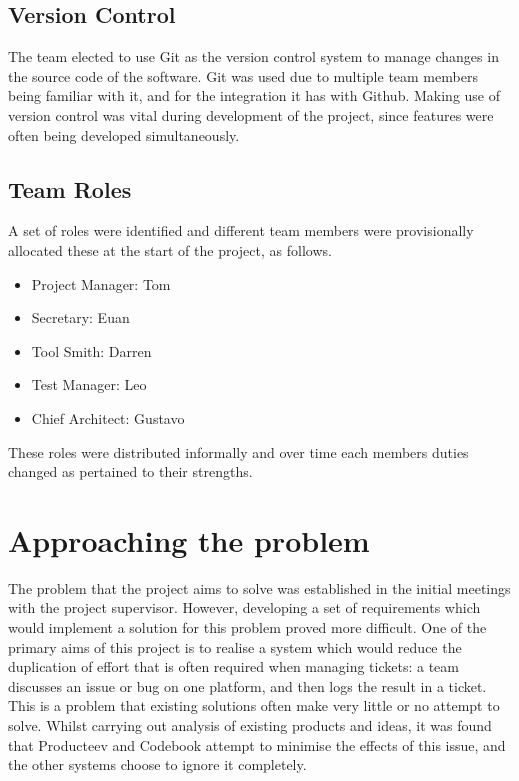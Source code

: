 \documentclass[a4paper]{l3proj}
\begin{document}
\subsection{Version Control}
\label{version}

The team elected to use Git as the version control system to manage changes in the source code of the software. Git was used due to multiple team members being familiar with it, and for the integration it has with Github. Making use of version control was vital during development of the project, since features were often being developed simultaneously.


\subsection{Team Roles}
\label{roles}

A set of roles were identified and different team members were provisionally allocated these at the start of the project, as follows.

\begin{itemize}
\item Project Manager: Tom
\item Secretary: Euan
\item Tool Smith: Darren
\item Test Manager: Leo
\item Chief Architect: Gustavo
\end{itemize}

These roles were distributed informally and over time each members duties changed as pertained to their strengths.

\section{Approaching the problem}
\label{requirements}

The problem that the project aims to solve was established in the initial meetings with the project supervisor. However, developing a set of requirements which would implement a solution for this problem proved more difficult. One of the primary aims of this project is to realise a system which would reduce the duplication of effort that is often required when managing tickets: a team discusses an issue or bug on one platform, and then logs the result in a ticket. This is a problem that existing solutions often make very little or no attempt to solve. Whilst carrying out analysis of existing products and ideas, it was found that Producteev and Codebook attempt to minimise the effects of this issue, and the other systems choose to ignore it completely.
\end{document}
